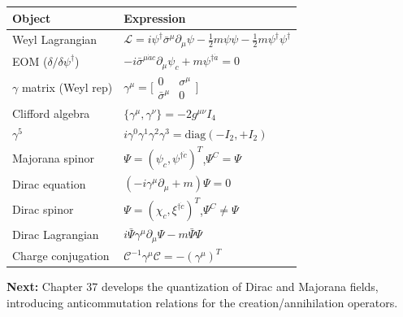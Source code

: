 \begin{center}
\renewcommand{\arraystretch}{1.4}
\begin{tabular}{@{}ll@{}}
  \toprule
  Object & Expression \\
  \midrule
  Weyl Lagrangian & $\mathcal{L}=i\psi^\dagger\bar\sigma^\mu\partial_\mu\psi
    -\frac{1}{2}m\psi\psi - \frac{1}{2}m\psi^\dagger\psi^\dagger$ \\
  EOM ($\delta/\delta\psi^\dagger$) & $-i\bar\sigma^{\mu\dot{a}c}\partial_\mu\psi_c
    +m\psi^{\dagger\dot{a}}=0$ \\
  $\gamma$ matrix (Weyl rep) & $\gamma^\mu=\bigl[\begin{smallmatrix}0&\sigma^\mu\\
    \bar\sigma^\mu&0\end{smallmatrix}\bigr]$ \\
  Clifford algebra & $\{\gamma^\mu,\gamma^\nu\}=-2g^{\mu\nu}I_4$ \\
  $\gamma^5$ & $i\gamma^0\gamma^1\gamma^2\gamma^3
    =\mathrm{diag}(-I_2,+I_2)$ \\
  Majorana spinor & $\Psi=(\psi_c,\psi^{\dagger\dot{c}})^T$,\quad $\Psi^C=\Psi$ \\
  Dirac equation & $(-i\gamma^\mu\partial_\mu+m)\Psi=0$ \\
  Dirac spinor & $\Psi=(\chi_c,\xi^{\dagger\dot{c}})^T$,\quad $\Psi^C\neq\Psi$ \\
  Dirac Lagrangian & $i\bar\Psi\gamma^\mu\partial_\mu\Psi - m\bar\Psi\Psi$ \\
  Charge conjugation & $\mathcal{C}^{-1}\gamma^\mu\mathcal{C}=-(\gamma^\mu)^T$ \\
  \bottomrule
\end{tabular}
\end{center}

\bigskip
\noindent\textbf{Next:} Chapter 37 develops the quantization of
Dirac and Majorana fields, introducing anticommutation relations for
the creation/annihilation operators.
